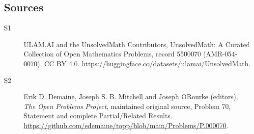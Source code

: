 \documentclass[11pt]{article}
\begin{document}
\subsection{Sources}
\begin{description}
\item[\hypertarget{source:5500070:1}{S1}] ULAM.AI and the UnsolvedMath Contributors, UnsolvedMath: A Curated Collection of Open Mathematics Problems, record 5500070 (AMR-054-0070). CC BY 4.0. \url{https://huggingface.co/datasets/ulamai/UnsolvedMath}.
\item[\hypertarget{source:5500070:2}{S2}] Erik D. Demaine, Joseph S. B. Mitchell and Joseph O\textquotesingle Rourke (editors), \emph{The Open Problems Project}, maintained original source, Problem 70, Statement and complete Partial/Related Results. \url{https://github.com/edemaine/topp/blob/main/Problems/P.000070}.
\end{description}
\label{end:5500070}
\end{document}
